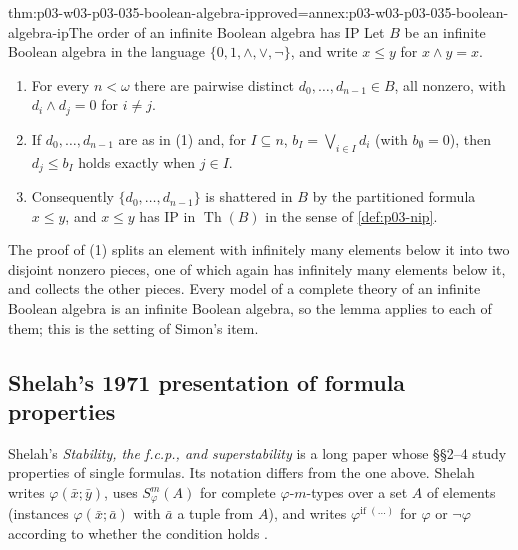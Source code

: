 \begin{hblemma}{thm:p03-w03-p03-035-boolean-algebra-ip}{proved=annex:p03-w03-p03-035-boolean-algebra-ip}{The order of an infinite Boolean algebra has IP}
Let \(B\) be an infinite Boolean algebra in the language
\(\{0,1,\wedge,\vee,\neg\}\), and write \(x\leq y\) for \(x\wedge y=x\).
\begin{enumerate}
  \item For every \(n<\omega\) there are pairwise distinct
        \(d_0,\ldots,d_{n-1}\in B\), all nonzero, with \(d_i\wedge d_j=0\)
        for \(i\neq j\).
  \item If \(d_0,\ldots,d_{n-1}\) are as in \textup{(1)} and, for
        \(I\subseteq n\), \(b_I=\bigvee_{i\in I}d_i\) (with \(b_\emptyset=0\)),
        then \(d_j\leq b_I\) holds exactly when \(j\in I\).
  \item Consequently \(\{d_0,\ldots,d_{n-1}\}\) is shattered in \(B\) by the
        partitioned formula \(x\leq y\), and \(x\leq y\) has IP in
        \(\operatorname{Th}(B)\) in the sense of \cref{def:p03-nip}.
\end{enumerate}
\end{hblemma}

The proof of \textup{(1)} splits an element with infinitely many elements
below it into two disjoint nonzero pieces, one of which again has infinitely
many elements below it, and collects the other pieces.  Every model of a
complete theory of an infinite Boolean algebra is an infinite Boolean
algebra, so the lemma applies to each of them; this is the setting of
Simon's item.

\subsection{Shelah's 1971 presentation of formula properties}
\label{sec:p03-w03-p03-035-shelah}

Shelah's \emph{Stability, the f.c.p., and superstability} is a long paper
whose \S\S 2--4 study properties of single formulas.  Its notation differs
from the one above.  Shelah writes \(\varphi(\bar x;\bar y)\), uses
\(S^m_\varphi(A)\) for complete \(\varphi\)-\(m\)-types over a set \(A\) of
elements (instances \(\varphi(\bar x;\bar a)\) with \(\bar a\) a tuple from
\(A\)), and writes \(\varphi^{\text{if }(\ldots)}\) for \(\varphi\) or
\(\neg\varphi\) according to whether the condition holds
\cite[\S 1 and pp.~296--297]{Shelah1971Stability}.

